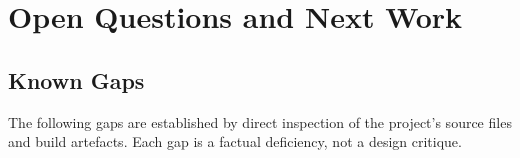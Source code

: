 
\section{Open Questions and Next Work}
\label{sec:experiments-visualizer-nextjs-open}

\subsection{Known Gaps}
\label{sec:experiments-visualizer-nextjs-open-gaps}

The following gaps are established by direct inspection of the project's source files and
build artefacts. Each gap is a factual deficiency, not a design critique.

